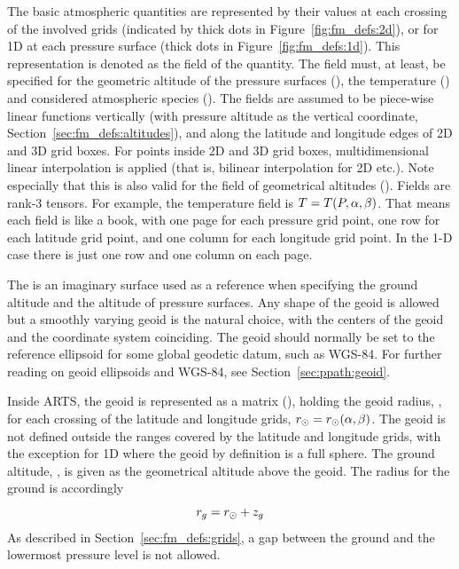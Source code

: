 The basic atmospheric quantities are represented by their values at
each crossing of the involved grids (indicated by thick dots in
Figure~\ref{fig:fm_defs:2d}), or for 1D at each pressure surface
(thick dots in Figure~\ref{fig:fm_defs:1d}). This representation is
denoted as the field of the quantity. The
field must, at least, be specified for the geometric altitude of the
pressure surfaces (), the temperature
() and considered atmospheric species
().  The fields are assumed to be piece-wise
linear functions vertically (with pressure altitude as the vertical
coordinate, Section~\ref{sec:fm_defs:altitudes}), and along the
latitude and longitude edges of 2D and 3D grid boxes. For points
inside 2D and 3D grid boxes, multidimensional linear interpolation is
applied (that is, bilinear interpolation for 2D etc.). Note especially
that this is also valid for the field of geometrical altitudes
(). Fields are rank-3 tensors. For example, the
temperature field is $T=T(P,\alpha,\beta)$. That means each field is
like a book, with one page for each pressure grid point, one row for
each latitude grid point, and one column for each longitude grid
point. In the 1-D case there is just one row and one column on each
page.



\label{sec:fm_defs:geoid}

The  is an imaginary surface used as a
reference when specifying the ground altitude and the altitude
of pressure surfaces. Any shape of the geoid is allowed but a smoothly
varying geoid is the natural choice, with the centers of the geoid and
the coordinate system coinciding. The geoid should normally be set to
the reference ellipsoid for some global geodetic datum, such as
WGS-84. For further reading on geoid ellipsoids and WGS-84, see
Section~\ref{sec:ppath:geoid}.

Inside ARTS, the geoid is represented as a matrix
(), holding the geoid radius, \aRds{\odot}, for
each crossing of the latitude and longitude grids,
$r_{\odot}=r_{\odot}(\alpha,\beta)$. The geoid is not defined
outside the ranges covered by the latitude and longitude grids, with
the exception for 1D where the geoid by definition is a full sphere.
The ground altitude, , is given as the geometrical altitude
above the geoid. The radius for the ground is accordingly
\begin{equation}
  r_{g} = r_{\odot} + z_{g}
 \label{eq:fm_defs:zground}
\end{equation}
As described in
Section~\ref{sec:fm_defs:grids}, a gap between the ground and the 
lowermost pressure level is not allowed.

